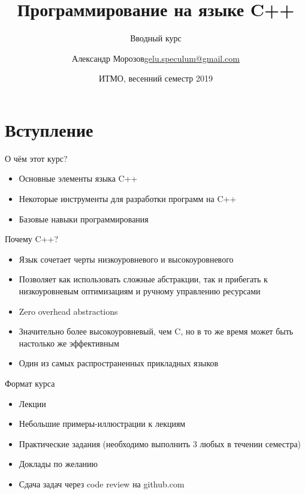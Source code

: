 \documentclass{beamer}
\title[C++]
{Программирование на языке C++}
\subtitle{Вводный курс}
\author[А.~Б.~Морозов]
{
  \texorpdfstring{Александр Морозов\newline\href{mailto:gelu.speculum@gmail.com}{gelu.speculum@gmail.com}}
  {Александр Морозов}
}
\date[ITMO 2019]
{ИТМО, весенний семестр 2019}
\begin{document}
 
\frame{\titlepage}

\section{Вступление}

\begin{frame}{О чём этот курс?}
\begin{itemize}
  \item Основные элементы языка C++ \vspace{3em}
  \item Некоторые инструменты для разработки программ на C++ \vspace{3em}
  \item Базовые навыки программирования \vspace{3em}
\end{itemize}
\end{frame}

\begin{frame}{Почему C++?}
\begin{itemize}
  \item Язык сочетает черты низкоуровневого и высокоуровневого \vspace{1em}
  \item Позволяет как использовать сложные абстракции, так и прибегать к низкоуровневым оптимизациям и ручному управлению ресурсами \vspace{1em}
  \item Zero overhead abstractions \vspace{1em}
  \item Значительно более высокоуровневый, чем C, но в то же время может быть настолько же эффективным \vspace{1em}
  \item Один из самых распространенных прикладных языков \vspace{1em}
\end{itemize}
\end{frame}

\begin{frame}{Формат курса}
  \begin{itemize}
    \item Лекции \vspace{1em}
    \item Небольшие примеры-иллюстрации к лекциям \vspace{1em}
    \item Практические задания (необходимо выполнить 3 любых в течении семестра) \vspace{1em}
    \item Доклады по желанию \vspace{1em}
    \item Сдача задач через code review на github.com \vspace{1em}
  \end{itemize}
\end{frame}
\end{document}
